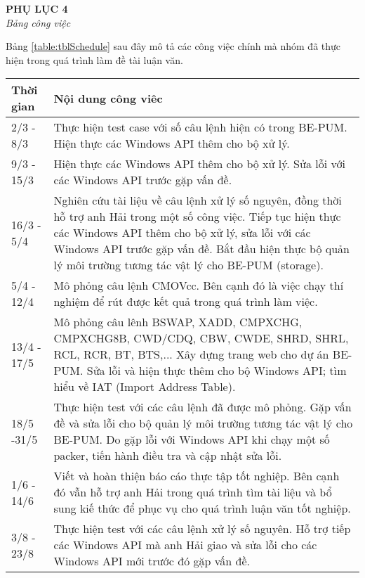 \begin{center}
	\begin{huge}
			\textbf{PHỤ LỤC 4}\\
			\textit{Bảng công việc}
	\end{huge}
\end{center}

Bảng \ref{table:tblSchedule} sau đây mô tả các công việc chính mà nhóm đã thực hiện trong quá trình làm đề tài luận văn.

	\begin{longtable}{|l|m{11cm}|}
		\hline
			Thời gian & Nội dung công viêc \\
		\hline
		\hline
			2/3 - 8/3	& Thực hiện test case với số câu lệnh hiện có trong BE-PUM. Hiện thực các Windows API thêm cho bộ xử lý.\\
		\hline
			9/3 - 15/3	& Hiện thực các Windows API thêm cho bộ xử lý. Sửa lỗi với các Windows API trước gặp vấn đề.\\
		\hline	
			16/3 - 5/4&	Nghiên cứu tài liệu về câu lệnh xử lý số nguyên, đồng thời hỗ trợ anh Hải trong một số công việc. Tiếp tục hiện thực các Windows API thêm cho bộ xử lý, sửa lỗi với các Windows API trước gặp vấn đề. Bắt đầu hiện thực bộ quản lý môi trường tương tác vật lý cho BE-PUM (storage).\\
		\hline	
			5/4 - 12/4&	Mô phỏng câu lệnh CMOVcc. Bên cạnh đó là việc chạy thí nghiệm để rút được kết quả trong quá trình làm việc.\\
		\hline	
			13/4 - 17/5	&Mô phỏng câu lênh  BSWAP, XADD, CMPXCHG, CMPXCHG8B, CWD/CDQ, CBW, CWDE, SHRD, SHRL, RCL, RCR,  BT, BTS,... Xây dựng trang web cho dự án BE-PUM. Sửa lỗi và hiện thực thêm cho bộ Windows API; tìm hiểu về IAT (Import Address Table).\\		
		\hline	
			18/5 -31/5	&Thực hiện test với các câu lệnh đã được mô phỏng. Gặp vấn đề và sửa lỗi cho bộ quản lý môi trường tương tác vật lý cho BE-PUM. Do gặp lỗi với Windows API khi chạy một số packer, tiến hành điều tra và cập nhật sửa lỗi.\\
		\hline	
			1/6 - 14/6	& Viết và hoàn thiện báo cáo thực tập tốt nghiệp. Bên cạnh đó vẫn hỗ trợ anh Hải trong quá trình tìm tài liệu và bổ sung kiế thức để phục vụ cho quá trình luận văn tốt nghiệp.\\	
		\hline	
			3/8 - 23/8&	Thực hiện test với các câu lệnh xử lý số nguyên. Hỗ trợ tiếp các Windows API mà anh Hải giao và sửa lỗi cho các Windows API mới trước đó gặp vấn đề.\\
		\hline	

\end{longtable}
